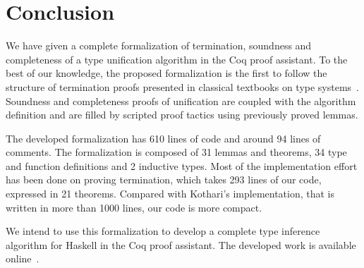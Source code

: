 \section{Conclusion}\label{conclusion}

We have given a complete formalization of termination, soundness and
completeness of a type unification algorithm in the Coq proof
assistant. To the best of our knowledge, the proposed formalization is
the first to follow the structure of termination proofs presented in
classical textbooks on type systems~. Soundness and completeness proofs of
unification are coupled with the algorithm definition and are filled
by scripted proof tactics using previously proved lemmas.

The developed formalization has 610 lines of code and around 94 lines of comments.
The formalization is composed of 31 lemmas and theorems, 34 type and
function definitions and 2 inductive types. Most of the implementation
effort has been done on proving termination, which takes 293 lines of
our code, expressed in 21 theorems. Compared with Kothari's
implementation, that is written in more than 1000 lines, our code is
more compact.

We intend to use this formalization to develop a complete type
inference algorithm for Haskell in the Coq proof assistant. The
developed work is available online~.
